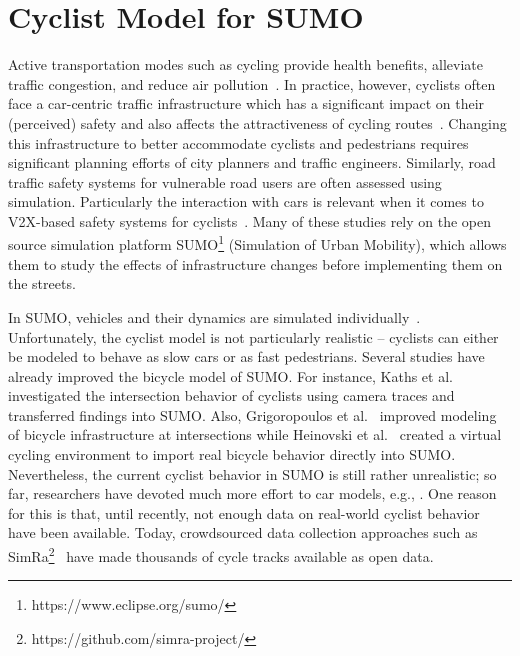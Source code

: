 \section{Cyclist Model for SUMO}
\label{sec:sumo}
Active transportation modes such as cycling provide health benefits, alleviate traffic congestion, and reduce air pollution~\cite{goetschi2016cycling}.
In practice, however, cyclists often face a car-centric traffic infrastructure which has a significant impact on their (perceived) safety and also affects the attractiveness of cycling routes~\cite{karakaya2020simra, pedroso2016bicycle,aldred2018predictors}.
Changing this infrastructure to better accommodate cyclists and pedestrians requires significant planning efforts of city planners and traffic engineers.
Similarly, road traffic safety systems for vulnerable road users are often assessed using simulation.
Particularly the interaction with cars is relevant when it comes to V2X-based safety systems for cyclists~\cite{oczko2020integrating}.
Many of these studies rely on the open source simulation platform SUMO\footnote{https://www.eclipse.org/sumo/} (Simulation of Urban Mobility), which allows them to study the effects of infrastructure changes before implementing them on the streets.

In SUMO, vehicles and their dynamics are simulated individually~\cite{lopez2018microscopic}.
Unfortunately, the cyclist model is not particularly realistic -- cyclists can either be modeled to behave as slow cars or as fast pedestrians.
Several studies have already improved the bicycle model of SUMO.
For instance, Kaths et al.~\cite{kaths2016integration} investigated the intersection behavior of cyclists using camera traces and transferred findings into SUMO.
Also, Grigoropoulos et al.~\cite{grigoropoulos2019modelling} improved modeling of bicycle infrastructure at intersections while Heinovski et al.~\cite{heinovski2019modeling} created a virtual cycling environment to import real bicycle behavior directly into SUMO.
Nevertheless, the current cyclist behavior in SUMO is still rather unrealistic; so far, researchers have devoted much more effort to car models, e.g., \cite{chandler1958traffic,gazis1961nonlinear,gipps1981behavioural, leutzbach1986development,bando1995dynamical,krauss1998microscopic,treiber2000congested,salles2020extending}.
One reason for this is that, until recently, not enough data on real-world cyclist behavior have been available.
Today, crowdsourced data collection approaches such as SimRa\footnote{https://github.com/simra-project/}~\cite{karakaya2020simra} have made thousands of cycle tracks available as open data.

